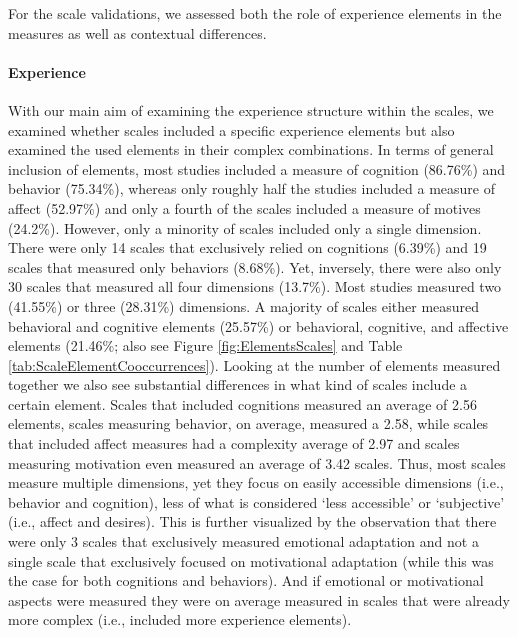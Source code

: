For the scale validations, we assessed both the role of experience
elements in the measures as well as contextual differences.

\paragraph{Experience}

With our main aim of examining the experience structure within the
scales, we examined whether scales included a specific experience
elements but also examined the used elements in their complex
combinations. In terms of general inclusion of elements, most studies
included a measure of cognition (86.76\%) and behavior (75.34\%),
whereas only roughly half the studies included a measure of affect
(52.97\%) and only a fourth of the scales included a measure of motives
(24.2\%). However, only a minority of scales included only a single
dimension. There were only 14 scales that exclusively relied on
cognitions (6.39\%) and 19 scales that measured only behaviors (8.68\%).
Yet, inversely, there were also only 30 scales that measured all four
dimensions (13.7\%). Most studies measured two (41.55\%) or three
(28.31\%) dimensions. A majority of scales either measured behavioral
and cognitive elements (25.57\%) or behavioral, cognitive, and affective
elements (21.46\%; also see Figure \ref{fig:ElementsScales} and Table
\ref{tab:ScaleElementCooccurrences}). Looking at the number of elements
measured together we also see substantial differences in what kind of
scales include a certain element. Scales that included cognitions
measured an average of 2.56 elements, scales measuring behavior, on
average, measured a 2.58, while scales that included affect measures had
a complexity average of 2.97 and scales measuring motivation even
measured an average of 3.42 scales. Thus, most scales measure multiple
dimensions, yet they focus on easily accessible dimensions (i.e.,
behavior and cognition), less of what is considered `less accessible' or
`subjective' (i.e., affect and desires). This is further visualized by
the observation that there were only 3 scales that exclusively measured
emotional adaptation and not a single scale that exclusively focused on
motivational adaptation (while this was the case for both cognitions and
behaviors). And if emotional or motivational aspects were measured they
were on average measured in scales that were already more complex (i.e.,
included more experience elements).


